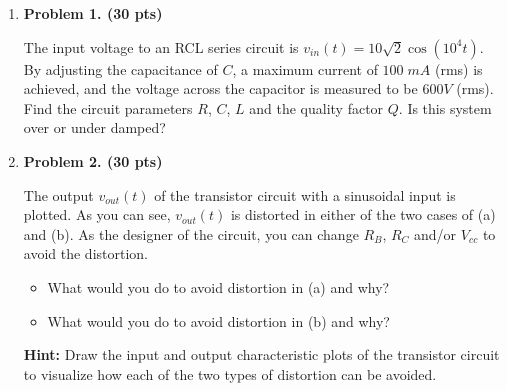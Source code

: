 \begin{enumerate}

\item {\bf Problem 1. (30 pts)} 

The input voltage to an RCL series circuit is $v_{in}(t)=10\sqrt{2}\cos(10^4 t)$.
By adjusting the capacitance of $C$, a maximum current of $100\;mA$ (rms) is 
achieved, and the voltage across the capacitor is measured to be $600 V$ (rms).
Find the circuit parameters $R$, $C$, $L$ and the quality factor $Q$. Is this 
system over or under damped?


\item {\bf Problem 2. (30 pts)} 

The output $v_{out}(t)$ of the transistor circuit with a sinusoidal input
is plotted. As you can see, $v_{out}(t)$ is distorted in either of the two
cases of (a) and (b). As the designer of the circuit, you can change $R_B$,
$R_C$ and/or $V_{cc}$ to avoid the distortion. 


\begin{itemize}
\item What would you do to avoid distortion in (a) and why? 
\item What would you do to avoid distortion in (b) and why? 
\end{itemize}


{\bf Hint:} Draw the input and output characteristic plots of the transistor
circuit to visualize how each of the two types of distortion can be avoided.

%


\end{enumerate}
